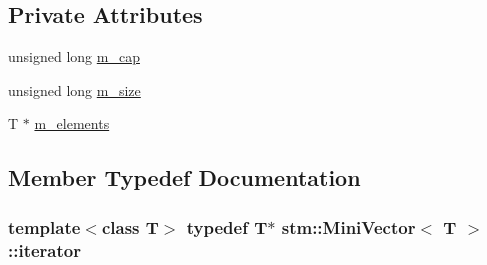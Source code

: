 \subsection*{Private Attributes}
\begin{DoxyCompactItemize}
\item 
unsigned long \hyperlink{classstm_1_1MiniVector_a4bd8f8e389faa9a5bb09021a442b7ccc}{m\-\_\-cap}
\item 
unsigned long \hyperlink{classstm_1_1MiniVector_a8dfe53c19634a322f594d5a09f591a1c}{m\-\_\-size}
\item 
T $\ast$ \hyperlink{classstm_1_1MiniVector_a0b43a284b4391e435e97aad1b4706c96}{m\-\_\-elements}
\end{DoxyCompactItemize}


\subsection{Member Typedef Documentation}
\hypertarget{classstm_1_1MiniVector_aa5998549c20eb0d6fac9bee27b4f0024}{
\subsubsection[{iterator}]{\setlength{\rightskip}{0pt plus 5cm}template$<$class T$>$ typedef T$\ast$ {\bf stm\-::\-Mini\-Vector}$<$ T $>$\-::{\bf iterator}}}\label{classstm_1_1MiniVector_aa5998549c20eb0d6fac9bee27b4f0024}


